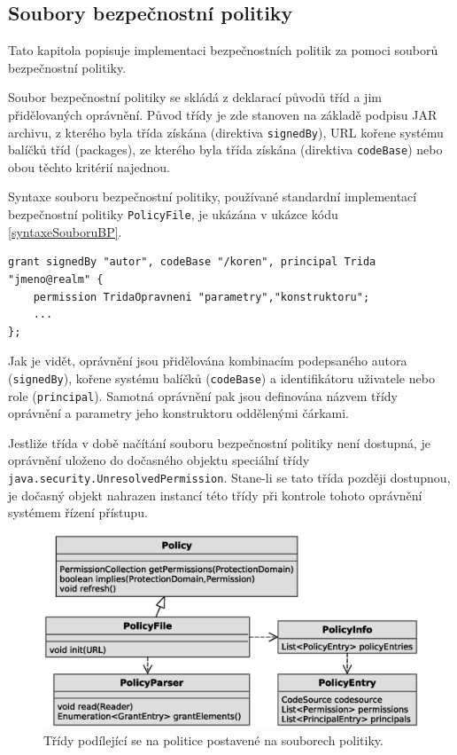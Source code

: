 \subsection{Soubory bezpečnostní politiky} \label{souboryBP}

Tato kapitola popisuje implementaci bezpečnostních politik za pomoci souborů bezpečnostní politiky.

Soubor bezpečnostní politiky se skládá z deklarací původů tříd a jim přidělovaných oprávnění.
Původ třídy je zde stanoven na základě podpisu JAR archivu, z kterého byla třída získána (direktiva {\tt signedBy}), URL kořene systému balíčků tříd (packages), ze kterého byla třída získána (direktiva {\tt codeBase}) nebo obou těchto kritérií najednou. \cite[5.3.1]{oaks}

Syntaxe souboru bezpečnostní politiky, používané standardní implementací bezpečnostní politiky {\tt PolicyFile}, je ukázána v ukázce kódu \ref{syntaxeSouboruBP}. \cite[5.3.1]{oaks}\cite{refPolicyFiles}

\begin{lstlisting}[caption=Syntaxe souboru bezpečnostní politiky, label=syntaxeSouboruBP]
grant signedBy "autor", codeBase "/koren", principal Trida "jmeno@realm" {
    permission TridaOpravneni "parametry","konstruktoru";
    ...
};
\end{lstlisting}

Jak je vidět, oprávnění jsou přidělována kombinacím podepsaného autora ({\tt signedBy}), kořene systému balíčků ({\tt codeBase}) a identifikátoru uživatele nebo role ({\tt principal}).
Samotná oprávnění pak jsou definována názvem třídy oprávnění a parametry jeho konstruktoru oddělenými čárkami.

Jestliže třída v době načítání souboru bezpečnostní politiky není dostupná, je oprávnění uloženo do dočasného objektu speciální třídy {\tt java.security.UnresolvedPermission}.
Stane-li se tato třída později dostupnou, je dočasný objekt nahrazen instancí této třídy při kontrole tohoto oprávnění systémem řízení přístupu. \cite{refUnresolvedPermission}

\begin{figure}[ht]
  \centering
  \includegraphics[width=12cm]{fig/policy-schema}
  \caption{Třídy podílející se na politice postavené na souborech politiky.}
  \label{tridyPolicyFile}
\end{figure}

